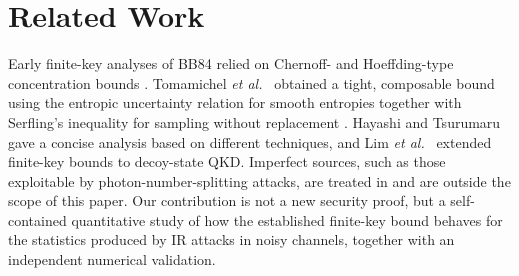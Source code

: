 \section{Related Work}\label{sec:related}
Early finite-key analyses of BB84 relied on Chernoff- and Hoeffding-type concentration bounds \cite{Hoeffding63,CaiScarani09}. Tomamichel \emph{et al.}\ \cite{Tomamichel12} obtained a tight, composable bound using the entropic uncertainty relation for smooth entropies \cite{TomamichelRenner11} together with Serfling's inequality for sampling without replacement \cite{Serfling74}. Hayashi and Tsurumaru \cite{HayashiTsurumaru12} gave a concise analysis based on different techniques, and Lim \emph{et al.}\ \cite{Lim14} extended finite-key bounds to decoy-state QKD. Imperfect sources, such as those exploitable by photon-number-splitting attacks, are treated in \cite{GLLP04,Brassard00} and are outside the scope of this paper. Our contribution is not a new security proof, but a self-contained quantitative study of how the established finite-key bound behaves for the statistics produced by IR attacks in noisy channels, together with an independent numerical validation.
